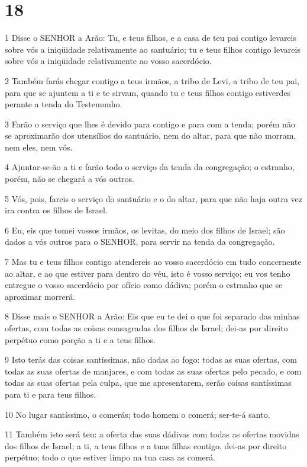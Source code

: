 \chapter{18}

\par 1 Disse o SENHOR a Arão: Tu, e teus filhos, e a casa de teu pai contigo levareis sobre vós a iniqüidade relativamente ao santuário; tu e teus filhos contigo levareis sobre vós a iniqüidade relativamente ao vosso sacerdócio.
\par 2 Também farás chegar contigo a teus irmãos, a tribo de Levi, a tribo de teu pai, para que se ajuntem a ti e te sirvam, quando tu e teus filhos contigo estiverdes perante a tenda do Testemunho.
\par 3 Farão o serviço que lhes é devido para contigo e para com a tenda; porém não se aproximarão dos utensílios do santuário, nem do altar, para que não morram, nem eles, nem vós.
\par 4 Ajuntar-se-ão a ti e farão todo o serviço da tenda da congregação; o estranho, porém, não se chegará a vós outros.
\par 5 Vós, pois, fareis o serviço do santuário e o do altar, para que não haja outra vez ira contra os filhos de Israel.
\par 6 Eu, eis que tomei vossos irmãos, os levitas, do meio dos filhos de Israel; são dados a vós outros para o SENHOR, para servir na tenda da congregação.
\par 7 Mas tu e teus filhos contigo atendereis ao vosso sacerdócio em tudo concernente ao altar, e ao que estiver para dentro do véu, isto é vosso serviço; eu vos tenho entregue o vosso sacerdócio por ofício como dádiva; porém o estranho que se aproximar morrerá.
\par 8 Disse mais o SENHOR a Arão: Eis que eu te dei o que foi separado das minhas ofertas, com todas as coisas consagradas dos filhos de Israel; dei-as por direito perpétuo como porção a ti e a teus filhos.
\par 9 Isto terás das coisas santíssimas, não dadas ao fogo: todas as suas ofertas, com todas as suas ofertas de manjares, e com todas as suas ofertas pelo pecado, e com todas as suas ofertas pela culpa, que me apresentarem, serão coisas santíssimas para ti e para teus filhos.
\par 10 No lugar santíssimo, o comerás; todo homem o comerá; ser-te-á santo.
\par 11 Também isto será teu: a oferta das suas dádivas com todas as ofertas movidas dos filhos de Israel; a ti, a teus filhos e a tuas filhas contigo, dei-as por direito perpétuo; todo o que estiver limpo na tua casa as comerá.
